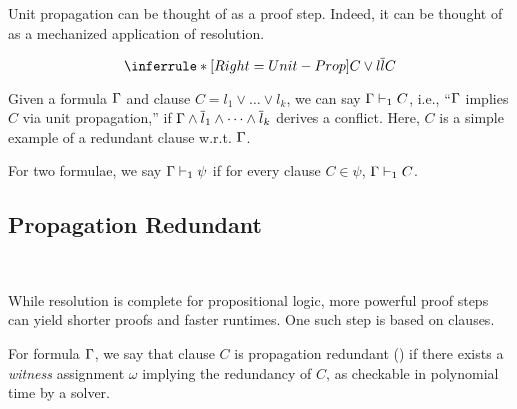 Unit propagation can be thought of as a proof step. Indeed, it can be thought of
as a mechanized application of resolution.

\begin{equation*}
    \inferrule*[Right=Unit-Prop]{
        C \lor l \\ \overline{l}
    }{
        C
    }
\end{equation*}

Given a formula $\Gamma$ and clause $C = l_1 \lor \dots \lor l_k$, we can say
$\Gamma \vdash_1 C$, i.e., ``$\Gamma$ implies $C$ via unit propagation,'' if
$\Gamma \land \overline{l}_1 \land \dots \land \overline{l}_k$ derives a
conflict. Here, $C$ is a simple example of a redundant clause w.r.t. $\Gamma$. 








For two formulae, we say $\Gamma \vdash_1 \psi$ if for every clause $C \in
\psi$, $\Gamma \vdash_1 C$. 


\subsection{Propagation Redundant}~\label{subsec:pr}

While resolution is complete for propositional logic, more powerful proof steps
can yield shorter proofs and faster runtimes. One such step is based on \pr
clauses.

\begin{definition}
    For formula $\Gamma$, we say that clause $C$ is propagation redundant
    (\pr) if there exists a \emph{witness} assignment $\omega$ implying the
    redundancy of $C$, as checkable in polynomial time by a solver. 
\end{definition}

